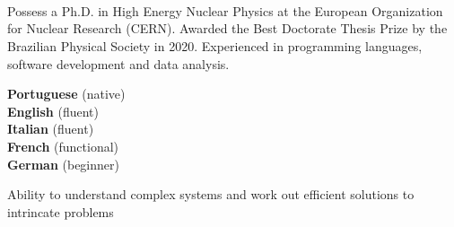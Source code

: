 \documentclass[9pt]{developercv} %
\begin{document}
\begin{minipage}[t]{0.27\textwidth} %
	\vspace{-\baselineskip} %
	
	\\	
    \\
    \\    
    
\end{minipage}


\begin{minipage}[t]{0.46\textwidth}
	\vspace{-6pt}

	Possess a Ph.D. in High Energy Nuclear Physics at the European Organization for Nuclear Research (CERN). Awarded the Best Doctorate Thesis Prize by the Brazilian Physical Society in 2020. Experienced in programming languages, software development and data analysis.
\end{minipage}
\hfill %
\begin{minipage}[t]{0.465\textwidth}
    \vspace{-6pt}

	\begin{minipage}[t]{0.35\textwidth}
		\textbf{Portuguese} (native)\vspace{0.5mm}\\
		\textbf{English} (fluent)\vspace{0.5mm}\\
		\textbf{Italian} (fluent)\vspace{0.5mm}\\
		\textbf{French} (functional)\vspace{0.5mm}\\
		\textbf{German} (beginner)
    \end{minipage}
    \hfill
    \begin{minipage}[t]{0.55\textwidth}
	Ability to understand complex systems and work out efficient solutions to intrincate problems
    \end{minipage}
    
\end{minipage}
\end{document}
